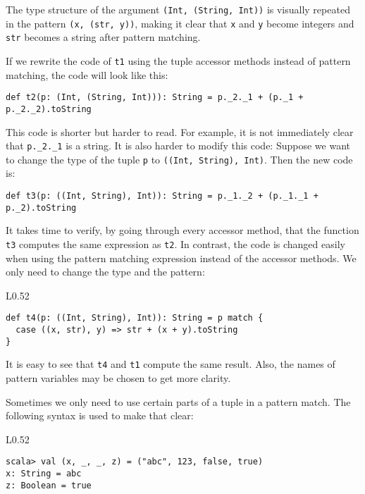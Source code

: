 \noindent The type structure of the argument \lstinline!(Int, (String, Int))!
is visually repeated in the pattern \lstinline!(x, (str, y))!, making
it clear that \lstinline!x! and \lstinline!y! become integers and
\lstinline!str! becomes a string after pattern matching.

If we rewrite the code of \lstinline!t1! using the tuple accessor
methods instead of pattern matching, the code will look like this:
\begin{lstlisting}
def t2(p: (Int, (String, Int))): String = p._2._1 + (p._1 + p._2._2).toString
\end{lstlisting}
This code is shorter but harder to read. For example, it is not immediately
clear that \lstinline!p._2._1! is a string. It is also harder to
modify this code: Suppose we want to change the type of the tuple
\lstinline!p! to \lstinline!((Int, String), Int)!. Then the new
code is:
\begin{lstlisting}
def t3(p: ((Int, String), Int)): String = p._1._2 + (p._1._1 + p._2).toString
\end{lstlisting}
It takes time to verify, by going through every accessor method, that
the function \lstinline!t3! computes the same expression as \lstinline!t2!.
In contrast, the code is changed easily when using the pattern matching
expression instead of the accessor methods. We only need to change
the type and the pattern:\hfill{}~\begin{wrapfigure}{L}{0.52\columnwidth}%
\vspace{-0.8\baselineskip}
\begin{lstlisting}
def t4(p: ((Int, String), Int)): String = p match {
  case ((x, str), y) => str + (x + y).toString
}
\end{lstlisting}
\vspace{-0.6\baselineskip}
\end{wrapfigure}%

\noindent It is easy to see that \lstinline!t4! and \lstinline!t1!
compute the same result. Also, the names of pattern variables may
be chosen to get more clarity.

Sometimes we only need to use certain parts of a tuple in a pattern
match. The following syntax is used to make that clear:

\begin{wrapfigure}{L}{0.52\columnwidth}%
\vspace{-0.8\baselineskip}
\begin{lstlisting}
scala> val (x, _, _, z) = ("abc", 123, false, true)
x: String = abc
z: Boolean = true
\end{lstlisting}
\vspace{-0.6\baselineskip}
\end{wrapfigure}%

